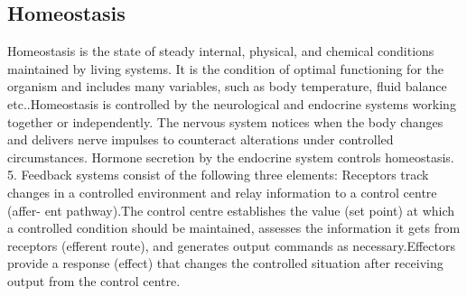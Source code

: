\documentclass[12pt]{article}
\begin{document}
\subsection{Homeostasis}
Homeostasis is the state of steady internal, physical, and chemical conditions maintained by living systems. It is the condition of optimal functioning for the organism and includes many variables, such as body temperature, fluid balance etc..Homeostasis is controlled by the neurological and endocrine systems working together or independently. The nervous system notices when the body changes and delivers nerve impulses to counteract alterations under controlled circumstances. Hormone secretion by the endocrine system controls homeostasis. 
5. Feedback systems consist of the following three elements: Receptors track changes in a controlled environment and relay information to a control centre (affer- ent pathway).The control centre establishes the value (set point) at which a controlled condition should be maintained, assesses the information it gets from receptors (efferent route), and generates output commands as necessary.Effectors provide a response (effect) that changes the controlled situation after receiving output from the control centre.
\end{document}
